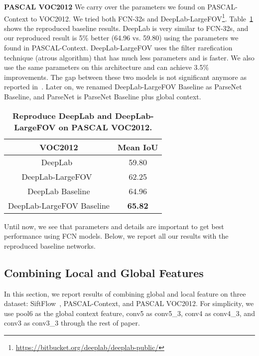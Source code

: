 \documentclass{article} \usepackage{iclr2016_conference}
\begin{document}
\noindent\textbf{PASCAL VOC2012} We carry over the parameters we found on PASCAL-Context to VOC2012. We tried both FCN-32s and DeepLab-LargeFOV\footnote{\url{https://bitbucket.org/deeplab/deeplab-public/}}. Table~\ref{tab:voc2012base} shows the reproduced baseline results. DeepLab is very similar to FCN-32s, and our reproduced result is 5\% better (64.96 vs. 59.80) using the parameters we found in PASCAL-Context. DeepLab-LargeFOV uses the filter rarefication technique (atrous algorithm) that has much less parameters and is faster. We also use the same parameters on this architecture and can achieve 3.5\% improvements. The gap between these two models is not significant anymore as reported in~\cite{chen2014semantic}. Later on, we renamed DeepLab-LargeFOV Baseline as ParseNet Baseline, and ParseNet is ParseNet Baseline plus global context.

\begin{table}[!htb]
	\centering
	\begin{tabular}{c|c}
		VOC2012 & Mean IoU\\
		\hline\hline
		DeepLab~\cite{chen2014semantic} & 59.80\\
		DeepLab-LargeFOV~\cite{chen2014semantic} & 62.25\\
		\hline
		DeepLab Baseline & 64.96\\
		DeepLab-LargeFOV Baseline & \textbf{65.82}\\
		\hline
	\end{tabular}
	\caption{\textbf{Reproduce DeepLab and DeepLab-LargeFOV on PASCAL VOC2012.}}\label{tab:voc2012base}
\end{table}

Until now, we see that parameters and details are important to get best performance using FCN models. Below, we report all our results with the reproduced baseline networks.

\subsection{Combining Local and Global Features}
\label{sec:normalize}
In this section, we report results of combining global and local feature on three dataset: SiftFlow~\cite{liu2011nonparametric}, PASCAL-Context, and PASCAL VOC2012. For simplicity, we use pool6 as the global context feature, conv5 as conv5\_3, conv4 as conv4\_3, and conv3 as conv3\_3 through the rest of paper.
\end{document}
